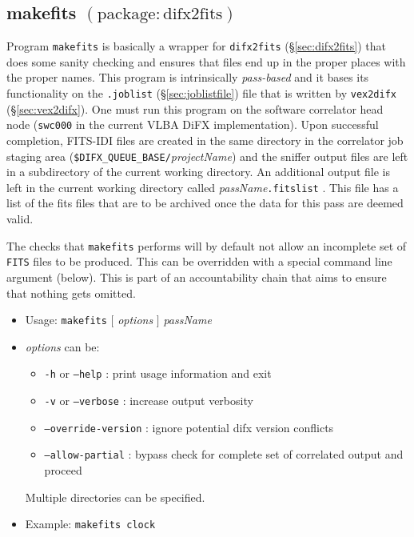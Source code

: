 
\subsection{makefits {\small $\mathrm{(package: difx2fits)}$}} \label{sec:makefits}

Program {\tt makefits} is basically a wrapper for {\tt difx2fits} (\S\ref{sec:difx2fits}) that does some sanity checking and ensures that files end up in the proper places with the proper names.
This program is intrinsically {\em pass-based} and it bases its functionality on the {\tt .joblist} (\S\ref{sec:joblistfile}) file that is written by {\tt vex2difx} (\S\ref{sec:vex2difx}).
One must run this program on the software correlator head node ({\tt swc000} in the current VLBA DiFX implementation).
Upon successful completion, FITS-IDI files are created in the same directory in the correlator job staging area ({\tt \$DIFX\_QUEUE\_BASE/}{\em projectName}) and the sniffer output files are left in a subdirectory of the current working directory.
An additional output file is left in the current working directory called {\em passName}{\tt .fitslist} .
This file has a list of the fits files that are to be archived once the data for this pass are deemed valid.

The checks that {\tt makefits} performs will by default not allow an incomplete set of {\tt FITS} files to be produced.
This can be overridden with a special command line argument (below).
This is part of an accountability chain that aims to ensure that nothing gets omitted.

\begin{itemize}
\item[] Usage: {\tt makefits} $[$ {\em options} $]$ {\em passName}
\item[] {\em options} can be:
\begin{itemize}
\item[] {\tt -h} or {\tt --help} : print usage information and exit
\item[] {\tt -v} or {\tt --verbose} : increase output verbosity
\item[] {\tt --override-version} : ignore potential difx version conflicts
\item[] {\tt --allow-partial} : bypass check for complete set of correlated output and proceed
\end{itemize}
Multiple directories can be specified.
\item[] Example: {\tt makefits clock}
\end{itemize}


